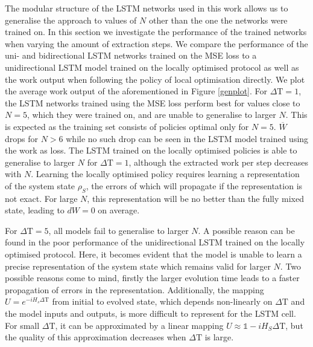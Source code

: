 The modular structure of the LSTM networks used in this work allows us to generalise the approach to values of $N$ other than the one the networks were trained on.
In this section we investigate the performance of the trained networks when varying the amount of extraction steps.
We compare the performance of the uni- and bidirectional LSTM networks trained on the MSE loss to a unidirectional LSTM model trained on the locally optimised protocol as well as the work output when following the policy of local optimisation directly.
We plot the average work output of the aforementioned in Figure \ref{genplot}.
For $\Delta \mathrm{T} = 1$, the LSTM networks trained using the MSE loss perform best for values close to $N=5$, which they were trained on, and are unable to generalise to larger $N$.
This is expected as the training set consists of policies optimal only for $N=5$.
$\overline{W}$ drops for $N > 6$ while no such drop can be seen in the LSTM model trained using the work as loss.
The LSTM trained on the locally optimised policies is able to generalise to larger $N$ for $\Delta \mathrm{T} = 1$, although the extracted work per step decreases with $N$.
Learning the locally optimised policy requires learning a representation of the system state $\rho_S$, the errors of which will propagate if the representation is not exact.
For large $N$, this representation will be no better than the fully mixed state, leading to $dW = 0$ on average.

For $\Delta \mathrm{T} = 5$, all models fail to generalise to larger $N$.
A possible reason can be found in the poor performance of the unidirectional LSTM trained on the locally optimised protocol.
Here, it becomes evident that the model is unable to learn a precise representation of the system state which remains valid for larger $N$.
Two possible reasons come to mind, firstly the larger evolution time leads to a faster propagation of errors in the representation.
Additionally, the mapping $U = e^{-i H_s \Delta \mathrm{T}}$ from initial to evolved state, which depends non-linearly on $\Delta \mathrm{T}$ and the model inputs and outputs, is more difficult to represent for the LSTM cell.
For small $\Delta \mathrm{T}$, it can be approximated by a linear mapping $U \approx \mathds{1} - i H_S \Delta \mathrm{T}$, but the quality of this approximation decreases when $\Delta \mathrm{T}$ is large.

